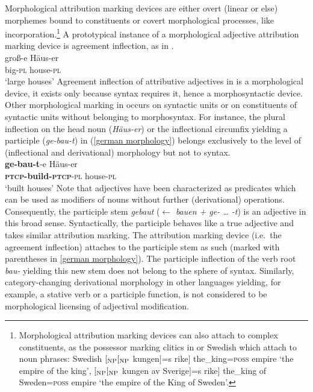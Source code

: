 Morphological attribution marking devices are either overt (linear or else) morphemes bound to constituents or covert morphological processes, like incorporation.\footnote{Morphological attribution marking devices can also attach to complex constituents, as the possessor marking clitics in  or Swedish which attach to noun phrases: Swedish $[_{\rm NP} [_{\rm NP}$ kungen$]$=s rike$]$ the\_king=\textsc{poss} empire ‘the empire of the king’, $[_{\rm NP} [_{\rm NP}$ kungen av Sverige$]$=s rike$]$ the\_king of Sweden=\textsc{poss} empire ‘the empire of the King of Sweden’.} A prototypical instance of a morphological adjective attribution marking device is agreement inflection, as in .
\ea
{}\\
\gll	groß-e Häus-er\\
	big-\textsc{pl} house-\textsc{pl}\\
\glt	‘large houses’
\z
Agreement inflection of attributive adjectives in  is a morphological device, it exists only because syntax requires it,  hence a morphosyntactic device. Other morphological marking in  occurs on syntactic units or on constituents of syntactic units without belonging to morphosyntax. For instance, the plural inflection on the head noun (\textit{Häus-er}) or the inflectional circumfix yielding a participle (\textit{ge-bau-t}) in (\ref{german morphology}) belongs exclusively to the level of (inflectional and derivational) morphology but not to syntax.
\ea\label{german morphology}
\\
\gll	\textbf{ge-bau-t}-e Häus-er\\
	\textbf{\textsc{ptcp}-build-\textsc{ptcp}}-\textsc{pl} house-\textsc{pl}\\
\glt	‘built houses’
\z
Note that adjectives have been characterized as predicates which can be used as modifiers of nouns without further (derivational) operations. Consequently, the  participle stem \textit{gebaut} ($\leftarrow$ \textit{bauen + ge- … -t}) is an adjective in this broad sense. Syntactically, the participle behaves like a true adjective and takes similar attribution marking. The attribution marking device (i.e.~the agreement inflection) attaches to the participle stem as such (marked with parentheses in \ref{german morphology}). The participle inflection of the verb root \textit{bau-} yielding this new stem does not belong to the sphere of syntax. Similarly, category-changing derivational morphology in other languages yielding, for example, a stative verb or a participle function, is not considered to be morphological licensing of adjectival modification.

